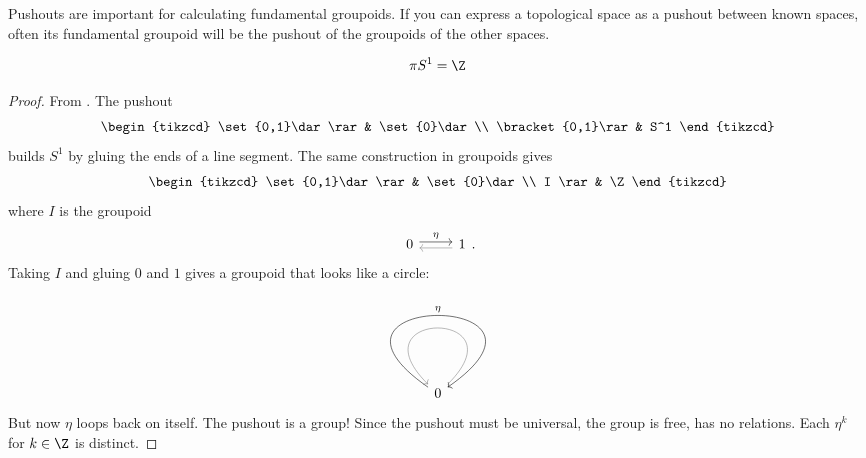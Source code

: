 \documentclass[a5paper]{scrartcl}
\begin{document}
Pushouts are important for calculating fundamental groupoids. If you can express a topological space as a pushout between known spaces, often its fundamental groupoid will be the pushout of the groupoids of the other spaces\cite[xxi]{groupoid}.
\begin{theorem}
  \[
    \pi S^1 = \Z
  \]
\end{theorem}
\begin{proof} From \cite[xxi]{groupoid}.
  The pushout
  \[
    \begin{tikzcd}
      \set{0,1}\dar\rar& \set{0}\dar \\
      \bracket{0,1}\rar& S^1
    \end{tikzcd}
  \]
  builds \(S^1\) by gluing the ends of a line segment. The same construction in groupoids gives
  \[
    \begin{tikzcd}
      \set{0,1}\dar\rar& \set{0}\dar \\
      I \rar& \Z
    \end{tikzcd}
  \]
  where \(I\) is the groupoid
  \[
    \begin{tikzcd}
      0\rar[shift left = .5ex]{\eta}& 1 \lar[shift left = .5ex,gray]{}
    \end{tikzcd}.
  \]
  Taking \(I\) and gluing \(0\) and \(1\) gives a groupoid that looks like a circle:
  \[
    \begin{tikzcd}
      0  \ar[<-,swap,loop,"\eta", in=145,out=35, looseness=22]{}
       \ar[gray,swap,loop,looseness=14]{}
    \end{tikzcd}
  \]
  But now \(\eta\) loops back on itself. The pushout is a group! Since the pushout must be universal, the group is free, has no relations. Each \(\eta^k\) for \(k\in\Z\) is distinct.
\end{proof}
\end{document}
